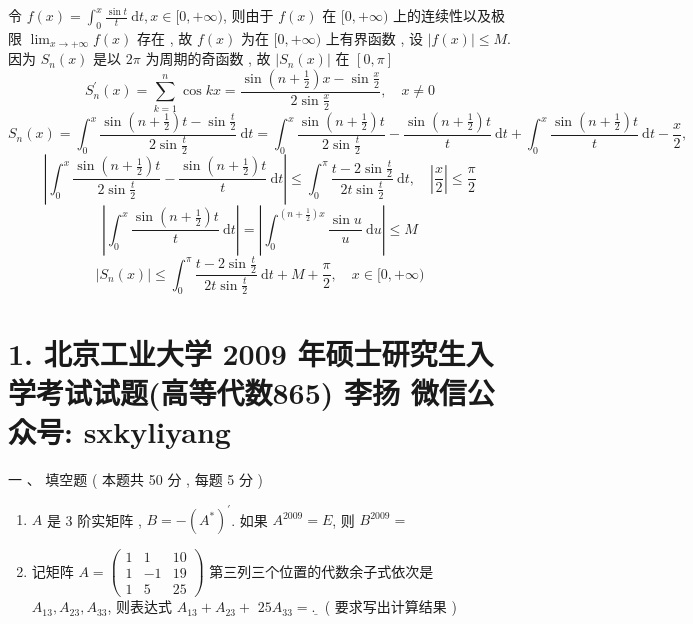 \documentclass[10pt]{article}
\begin{document}
{ 令  $f(x)=\int_{0}^{x} \frac{\sin t}{t} \mathrm{~d} t, x \in[0,+\infty)$,  则由于  $f(x)$  在  $[0,+\infty)$  上的连续性以及极限  $\lim _{x \rightarrow+\infty} f(x)$  存在 ,  故  $f(x)$  为在  $[0,+\infty)$  上有界函数 ,  设  $|f(x)| \leqslant M$.  因为  $S_{n}(x)$  是以  $2 \pi$  为周期的奇函数 ,  故  $\left|S_{n}(x)\right|$  在  $[0, \pi]$
$$
S_{n}^{\prime}(x)=\sum_{k=1}^{n} \cos k x=\frac{\sin \left(n+\frac{1}{2}\right) x-\sin \frac{x}{2}}{2 \sin \frac{x}{2}}, \quad x \neq 0
$$
$$
S_{n}(x)=\int_{0}^{x} \frac{\sin \left(n+\frac{1}{2}\right) t-\sin \frac{t}{2}}{2 \sin \frac{t}{2}} \mathrm{~d} t=\int_{0}^{x} \frac{\sin \left(n+\frac{1}{2}\right) t}{2 \sin \frac{t}{2}}-\frac{\sin \left(n+\frac{1}{2}\right) t}{t} \mathrm{~d} t+\int_{0}^{x} \frac{\sin \left(n+\frac{1}{2}\right) t}{t} \mathrm{~d} t-\frac{x}{2},
$$
$$
\left|\int_{0}^{x} \frac{\sin \left(n+\frac{1}{2}\right) t}{2 \sin \frac{t}{2}}-\frac{\sin \left(n+\frac{1}{2}\right) t}{t} \mathrm{~d} t\right| \leqslant \int_{0}^{\pi} \frac{t-2 \sin \frac{t}{2}}{2 t \sin \frac{t}{2}} \mathrm{~d} t, \quad\left|\frac{x}{2}\right| \leqslant \frac{\pi}{2}
$$
$$
\left|\int_{0}^{x} \frac{\sin \left(n+\frac{1}{2}\right) t}{t} \mathrm{~d} t\right|=\left|\int_{0}^{\left(n+\frac{1}{2}\right) x} \frac{\sin u}{u} \mathrm{~d} u\right| \leqslant M
$$
$$
\left|S_{n}(x)\right| \leqslant \int_{0}^{\pi} \frac{t-2 \sin \frac{t}{2}}{2 t \sin \frac{t}{2}} \mathrm{~d} t+M+\frac{\pi}{2}, \quad x \in[0,+\infty)
$$

\section{1. 北京工业大学 2009 年硕士研究生入学考试试题(高等代数865) 
 李扬 
 微信公众号: sxkyliyang}
 一 、 填空题 ( 本题共  50  分 ,  每题  5  分 )

\begin{enumerate}
  \item $A$  是  3  阶实矩阵 , $B=-\left(A^{*}\right)^{\prime}$.  如果  $A^{2009}=E$,  则  $B^{2009}=$

  \item  记矩阵  $A=\left(\begin{array}{ccc}1 & 1 & 10 \\ 1 & -1 & 19 \\ 1 & 5 & 25\end{array}\right)$  第三列三个位置的代数余子式依次是  $A_{13}, A_{23}, A_{33}$,  则表达式  $A_{13}+A_{23}+$ $25 A_{33}=\underline{\text {. }}$ ( 要求写出计算结果 )


\end{enumerate}}
\end{document}
